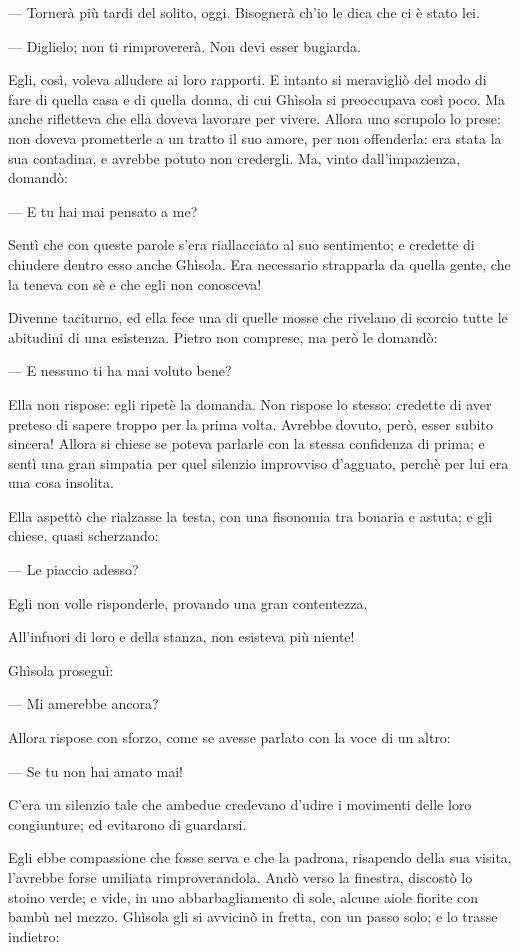 — Tornerà più tardi del solito, oggi. Bisognerà ch’io le dica che ci è stato lei.

— Diglielo; non ti rimprovererà. Non devi esser bugiarda.

Egli, così, voleva alludere ai loro rapporti. E intanto si meravigliò del modo di fare di quella casa e di quella donna, di cui Ghìsola si preoccupava così poco. Ma anche rifletteva che ella doveva lavorare per vivere. Allora uno scrupolo lo prese: non doveva prometterle a un tratto il suo amore, per non offenderla: era stata la sua contadina, e avrebbe potuto non credergli. Ma, vinto dall’impazienza, domandò:

— E tu hai mai pensato a me?

Sentì che con queste parole s’era riallacciato al suo sentimento; e credette di chiudere dentro esso anche Ghìsola. Era necessario strapparla da quella gente, che la teneva con sè e che egli non conosceva!

Divenne taciturno, ed ella fece una di quelle mosse che rivelano di scorcio tutte le abitudini di una esistenza. Pietro non comprese, ma però le domandò:

— E nessuno ti ha mai voluto bene?

Ella non rispose: egli ripetè la domanda. Non rispose lo stesso: credette di aver preteso di sapere troppo per la prima volta. Avrebbe dovuto, però, esser subito sincera! Allora si chiese se poteva parlarle con la stessa confidenza di prima; e sentì una gran simpatia per quel silenzio improvviso d’agguato, perchè per lui era una cosa insolita.

Ella aspettò che rialzasse la testa, con una fisonomia tra bonaria e astuta; e gli chiese, quasi scherzando:

— Le piaccio adesso?

Egli non volle risponderle, provando una gran contentezza.

All’infuori di loro e della stanza, non esisteva più niente!

Ghìsola proseguì:

— Mi amerebbe ancora?

Allora rispose con sforzo, come se avesse parlato con la voce di un altro:

— Se tu non hai amato mai!

C’era un silenzio tale che ambedue credevano d’udire i movimenti delle loro congiunture; ed evitarono di guardarsi.

Egli ebbe compassione che fosse serva e che la padrona, risapendo della sua visita, l’avrebbe forse umiliata rimproverandola. Andò verso la finestra, discostò lo stoino verde; e vide, in uno abbarbagliamento di sole, alcune aiole fiorite con bambù nel mezzo. Ghìsola gli si avvicinò in fretta, con un passo solo; e lo trasse indietro:

